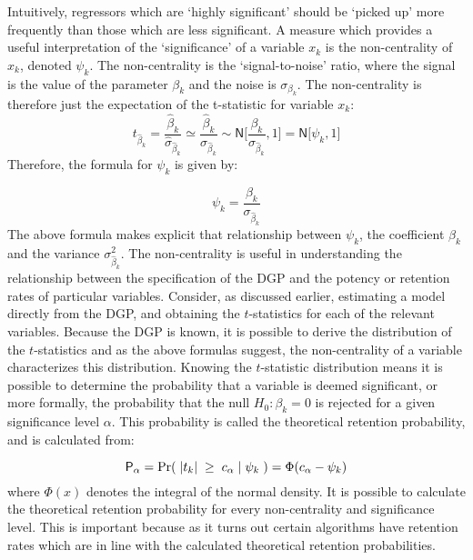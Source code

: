 Intuitively, regressors which are `highly significant' should be `picked up' more frequently than those which are less significant. A measure which provides a useful interpretation of the `significance' of a variable $x_{k}$ is the non-centrality of $x_{k}$, denoted $\psi_{k}$. The non-centrality is the `signal-to-noise' ratio, where the signal is the value of the parameter $\beta_{k}$ and the noise is $\sigma_{\beta_{k}}$. The non-centrality is therefore just the expectation of the t-statistic for variable $x_{k}$:
$$t_{\widehat{\beta}_{k}}=\frac{\widehat{\beta}_{k}}{\widehat{\sigma}_{\widehat{\beta}_{k}}} \simeq \frac{\widehat{\beta}_{k}}{\sigma_{\widehat{\beta}_{k}}} \sim \mathsf{N} \Bigg[\frac{\beta_{k}}{\sigma_{\widehat{\beta}_{k}}}, 1 \Bigg] = \mathsf{N} \big[\psi_{k}, 1 \big] $$
Therefore, the formula for $\psi_{k}$ is given by:

$$\psi_{k} = \frac{\beta_{k}}{\sigma_{\widehat{\beta}_{k}}}$$
The above formula makes explicit that relationship between $\psi_{k}$, the coefficient $\beta_{k}$ and the variance $\sigma_{\widehat{\beta}_{k}}^{2}$. The non-centrality is useful in understanding the relationship between the specification of the DGP and the potency or retention rates of particular variables. Consider, as discussed earlier, estimating a model directly from the DGP, and obtaining the $t$-statistics for each of the relevant variables. Because the DGP is known, it is possible to derive the distribution of the $t$-statistics and as the above formulas suggest, the non-centrality of a variable characterizes this distribution. Knowing the $t$-statistic distribution means it is possible to determine the probability that a variable is deemed significant, or more formally, the probability that the null $H_{0}: \beta_{k} = 0$ is rejected for a given significance level $\alpha$. This probability is called the theoretical retention probability, and is calculated from:

$$ \mathsf{P}_{\alpha} = \Pr( \hspace{0.1cm}|t_{k}| \hspace{0.1cm} \geq \hspace{0.1cm} c_{\alpha} \hspace{0.1cm} | \hspace{0.1cm}\psi_{k}\hspace{0.1cm}) = \Phi({c_{\alpha}-\psi_{k}})$$
where $\Phi(x)$ denotes the integral of the normal density. It is possible to calculate the theoretical retention probability for every non-centrality and significance level. This is important because as it turns out certain algorithms have retention rates which are in line with the calculated theoretical retention probabilities. 

